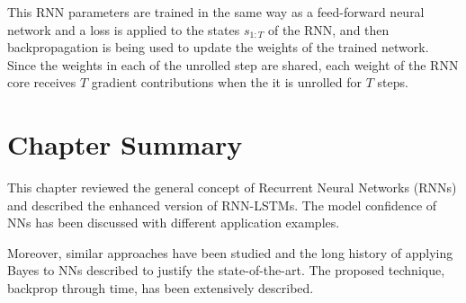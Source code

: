 This RNN parameters are trained in the same way as a feed-forward neural network and a loss is applied to the states $s_{1:T}$ of the RNN, and then backpropagation is being used to update the weights of the trained network.
Since the weights in each of the unrolled step are shared, each weight of the RNN core receives $T$ gradient contributions when the it is unrolled for $T$ steps.

\section{Chapter Summary}
This chapter reviewed the general concept of Recurrent Neural Networks (RNNs) and described the enhanced version of RNN-LSTMs. The model confidence of NNs has been discussed with different application examples. 

Moreover, similar approaches have been studied and the long history of applying Bayes to NNs described to justify the state-of-the-art. The proposed technique, backprop through time, has been extensively described.